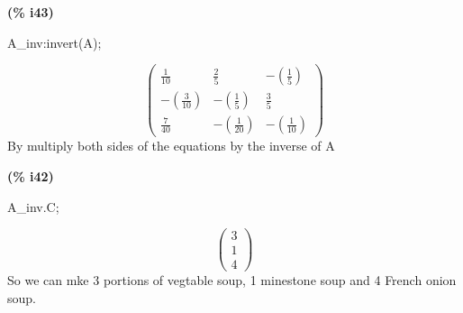 \documentclass[fleqn]{article}
\begin{document}
\noindent
\begin{minipage}[t]{4.000000em}\color{red}\bfseries
(\% i43)	
\end{minipage}
\begin{minipage}[t]{\textwidth}\color{blue}
A\_inv:invert(A);
\end{minipage}
\[\displaystyle \tag{A\_ inv} 
\begin{pmatrix}\frac{1}{10} & \frac{2}{5} & \mathop{-}\left( \frac{1}{5}\right) \\
\mathop{-}\left( \frac{3}{10}\right)  & \mathop{-}\left( \frac{1}{5}\right)  & \frac{3}{5}\\
\frac{7}{40} & \mathop{-}\left( \frac{1}{20}\right)  & \mathop{-}\left( \frac{1}{10}\right) \end{pmatrix}\mbox{}
\]
By multiply both sides of the equations by the inverse of A


\noindent
\begin{minipage}[t]{4.000000em}\color{red}\bfseries
(\% i42)	
\end{minipage}
\begin{minipage}[t]{\textwidth}\color{blue}
A\_inv.C;
\end{minipage}
\[\displaystyle \tag{\% o42} 
\begin{pmatrix}3\\
1\\
4\end{pmatrix}\mbox{}
\]
So we can mke 3 portions of vegtable soup, 1 minestone soup and 4 French onion soup.
\end{document}
